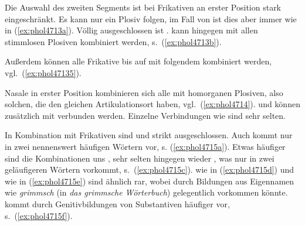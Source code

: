 Die Auswahl des zweiten Segments ist bei Frikativen an erster Position stark eingeschränkt.
Es kann nur ein Plosiv folgen, im Fall von \textipa{[f s \c{c} X]} ist dies aber immer \textipa{[t]} wie in (\ref{ex:phol4713a}).
Völlig ausgeschlossen ist \textipa{[S]}.
\textipa{[K]} kann hingegen mit allen stimmlosen Plosiven kombiniert werden, s.\ (\ref{ex:phol4713b}).

\begin{exe}
  \ex\label{ex:phol4713}
  \begin{xlist}
  \end{xlist}
\end{exe}

Außerdem können alle Frikative bis auf \textipa{[s]} mit folgendem \textipa{[s]} kombiniert werden, vgl.\ (\ref{ex:phol47135}).

\begin{exe}
\end{exe}

Nasale in erster Position kombinieren sich alle mit homorganen Plosiven, also solchen, die den gleichen Artikulationsort haben, vgl.\ (\ref{ex:phol4714}).
\textipa{[m]} und \textipa{[N]} können zusätzlich mit \textipa{[t]} verbunden werden.
Einzelne Verbindungen wie \textipa{[mp]} sind sehr selten.

\begin{exe}
  \ex\label{ex:phol4714}
  \begin{xlist}
  \end{xlist}
\end{exe}

In Kombination mit Frikativen sind \textipa{[nX]} und \textipa{[nK]} strikt ausgeschlossen.
Auch \textipa{[n\c{c}]} kommt nur in zwei nennenswert häufigen Wörtern vor, s. (\ref{ex:phol4715a}).
Etwas häufiger sind die Kombinationen \textipa{[nf]} uns \textipa{[ns]}, sehr selten hingegen wieder \textipa{[nS]}, was nur in zwei geläufigeren Wörtern vorkommt, s.\ (\ref{ex:phol4715c}).
\textipa{[ms]} wie in (\ref{ex:phol4715d}) und \textipa{[mS]} wie in (\ref{ex:phol4715e}) sind ähnlich rar, wobei \textipa{[mS]} durch Bildungen aus Eigennamen wie \textit{grimmsch} (in \textit{das grimmsche Wörterbuch}) gelegentlich vorkommen könnte.
\textipa{[Ns]} kommt durch Genitivbildungen von Substantiven häufiger vor, s.\ (\ref{ex:phol4715f}).

